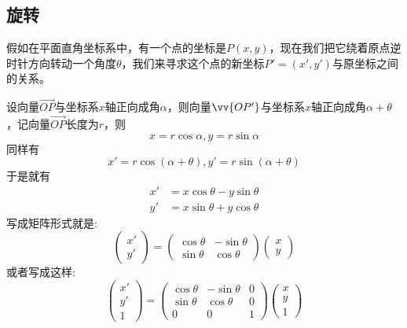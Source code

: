 \subsection{旋转}
假如在平面直角坐标系中，有一个点的坐标是$P(x,y)$，现在我们把它绕着原点逆时针方向转动一个角度$\theta$，我们来寻求这个点的新坐标$P'=(x', y')$与原坐标之间的关系。

设向量$\overrightarrow{OP}$与坐标系$x$轴正向成角$\alpha$，则向量$\vv{OP'}$与坐标系$x$轴正向成角$\alpha+\theta$，记向量$\overrightarrow{OP}$长度为$r$，则
\begin{equation*}
  x=r\cos{\alpha},y=r\sin{\alpha}
\end{equation*}
同样有
\begin{equation*}
  x'=r\cos{(\alpha+\theta)},y'=r\sin{(\alpha+\theta)}
\end{equation*}
于是就有
\begin{equation}
  \label{eq:formulas-rotation-axias}
  \begin{split}
  x' & = x\cos{\theta} - y\sin{\theta} \\
  y' & = x\sin{\theta} + y\cos{\theta}
  \end{split}
\end{equation}
写成矩阵形式就是:
\begin{equation*}
  \left(
    \begin{array}{c}
      x' \\
      y'
    \end{array}
  \right)
    =
    \left(
      \begin{array}{cc}
        \cos{\theta} & -\sin{\theta} \\
        \sin{\theta} & \cos{\theta}
      \end{array}
    \right)
  \left(
    \begin{array}{c}
      x \\
      y
    \end{array}
  \right)
\end{equation*}
或者写成这样:
\begin{equation*}
  \label{eq:formulas-rotation-axias-matrix}
  \left(
    \begin{array}{c}
      x' \\
      y' \\
      1
    \end{array}
  \right)
    =
    \left(
      \begin{array}{ccc}
        \cos{\theta} & -\sin{\theta} & 0 \\
        \sin{\theta} & \cos{\theta} & 0 \\
        0 & 0 & 1
      \end{array}
    \right)
  \left(
    \begin{array}{c}
      x \\
      y \\
      1
    \end{array}
  \right)
\end{equation*}

